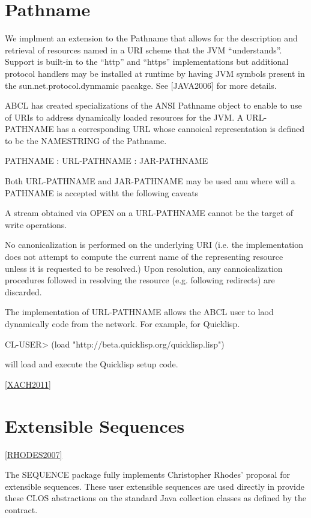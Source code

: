 \documentclass[10pt]{book}
\begin{document}
\section{Pathname}

We implment an extension to the Pathname that allows for the
description and retrieval of resources named in a URI scheme that the
JVM ``understands''.  Support is built-in to the ``http'' and
``https'' implementations but additional protocol handlers may be
installed at runtime by having JVM symbols present in the
sun.net.protocol.dynmamic pacakge. See [JAVA2006] for more details.

ABCL has created specializations of the ANSI Pathname object to
enable to use of URIs to address dynamically loaded resources for the
JVM.  A URL-PATHNAME has a corresponding URL whose cannoical
representation is defined to be the NAMESTRING of the Pathname.

PATHNAME : URL-PATHNAME : JAR-PATHNAME

Both URL-PATHNAME and JAR-PATHNAME may be used anu where will a
PATHNAME is accepted witht the following caveats

A stream obtained via OPEN on a URL-PATHNAME cannot be the target of
write operations.

No canonicalization is performed on the underlying URI (i.e. the
implementation does not attempt to compute the current name of the
representing resource unless it is requested to be resolved.)  Upon
resolution, any cannoicalization procedures followed in resolving the
resource (e.g. following redirects) are discarded.  

The implementation of URL-PATHNAME allows the ABCL user to laod dynamically
code from the network.  For example, for Quicklisp.

\begin{listing-lisp}
  CL-USER> (load "http://beta.quicklisp.org/quicklisp.lisp")
\end{listing-lisp}

will load and execute the Quicklisp setup code.

\ref{XACH2011}
         
\section{Extensible Sequences}

\ref{RHODES2007}

The SEQUENCE package fully implements Christopher Rhodes' proposal for
extensible sequences.  These user extensible sequences are used
directly in  provide these CLOS
abstractions on the standard Java collection classes as defined by the
 contract.
\end{document}
